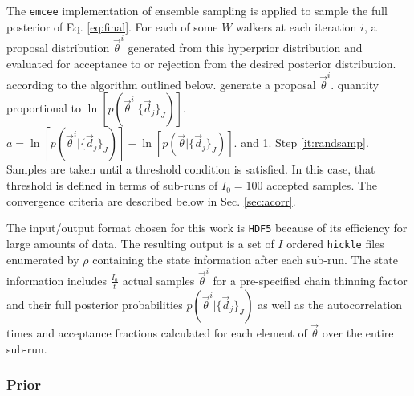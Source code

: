 \documentclass[preprint]{aastex}
\begin{document}
The \texttt{emcee} \citep{Foreman-Mackey2013} implementation of ensemble 
sampling is applied to sample the full posterior of Eq. \ref{eq:final}.   For 
each of some $W$ walkers at each iteration $i$, a proposal distribution 
$\vec{\theta}^{i}$ generated from this hyperprior distribution and evaluated 
for acceptance to or rejection from the desired posterior distribution.%
according to the algorithm outlined below.  
%
generate a proposal $\vec{\theta}^{i}$.
quantity proportional to $\ln[p(\vec{\theta}^{i}|\{\vec{d}_{j}\}_{J})]$.
$a=\ln[p(\vec{\theta}^{i}|\{\vec{d}_{j}\}_{J})]-\ln[p(\vec{\theta}|\{\vec{d}_{j}
\}_{J})]$.
and 1.
Step \ref{it:randsamp}.
Samples are taken until a threshold condition is satisfied.  In this case, that 
threshold is defined in terms of sub-runs of $I_{0}=100$ accepted samples.  The 
convergence criteria are described below in Sec. \ref{sec:acorr}.

The input/output format chosen for this work is \texttt{HDF5} because of its 
efficiency for large amounts of data.  The resulting output is a set of $I$ 
ordered \texttt{hickle} files enumerated by $\rho$ containing the state 
information after each sub-run.  The state information includes 
$\frac{I_{0}}{t}$ actual samples $\vec{\theta}^{i}$ for a pre-specified chain 
thinning factor and their full posterior probabilities 
$p(\vec{\theta}^{i}|\{\vec{d}_{j}\}_{J})$ as well as the autocorrelation times 
and acceptance fractions calculated for each element of $\vec{\theta}$ over the 
entire sub-run.  

\clearpage
\subsubsection{Prior}
\label{sec:prior}
\end{document}
